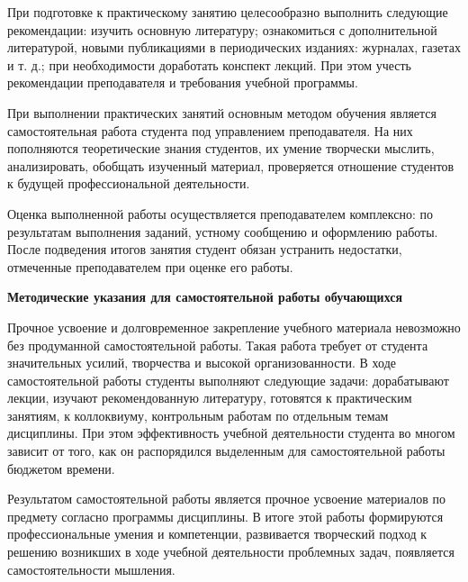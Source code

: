 \documentclass[a4paper, 12pt]{article}
\begin{document}
При подготовке к практическому занятию целесообразно выполнить следующие рекомендации: изучить основную литературу; ознакомиться с дополнительной литературой, новыми публикациями в периодических изданиях: журналах, газетах и т. д.; при необходимости доработать конспект лекций. При этом учесть рекомендации преподавателя и требования учебной программы.

При выполнении практических занятий основным методом обучения является самостоятельная работа студента под управлением преподавателя. На них пополняются теоретические знания студентов, их умение творчески мыслить, анализировать, обобщать изученный материал, проверяется отношение студентов к будущей профессиональной деятельности.

Оценка выполненной работы осуществляется преподавателем комплексно: по результатам выполнения заданий, устному сообщению и оформлению работы. После подведения итогов занятия студент обязан устранить недостатки, отмеченные преподавателем при оценке его работы.

\vspace{8pt}
{\bf Методические указания для самостоятельной работы обучающихся}

Прочное усвоение и долговременное закрепление учебного материала невозможно без продуманной самостоятельной работы. Такая работа требует от студента значительных усилий, творчества и высокой организованности. В ходе самостоятельной работы студенты выполняют следующие задачи: дорабатывают лекции, изучают рекомендованную литературу, готовятся к практическим занятиям, к коллоквиуму, контрольным работам по отдельным темам дисциплины. При этом эффективность учебной деятельности студента во многом зависит от того, как он распорядился выделенным для самостоятельной работы бюджетом времени.

Результатом самостоятельной работы является прочное усвоение материалов по предмету согласно программы дисциплины. В итоге этой работы формируются профессиональные умения и компетенции, развивается творческий подход к решению возникших в ходе учебной деятельности проблемных задач, появляется самостоятельности мышления.
\end{document}
